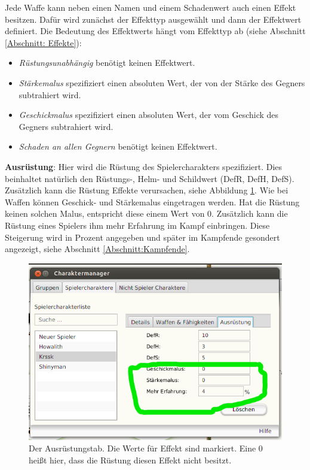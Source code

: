 \documentclass[11pt, a4paper, german]{article}
\begin{document}
Jede Waffe kann neben einen Namen und einem Schadenwert auch einen Effekt besitzen. Dafür wird zunächst der Effekttyp ausgewählt und dann der Effektwert definiert. Die Bedeutung des Effektwerts hängt vom Effekttyp ab (siehe Abschnitt \ref{Abschnitt: Effekte}): \begin{itemize}
\item[] \textit{Rüstungsunabhängig} benötigt keinen Effektwert.
\item[] \textit{Stärkemalus} spezifiziert einen absoluten Wert, der von der Stärke des Gegners subtrahiert wird.
\item[] \textit{Geschickmalus} spezifiziert einen absoluten Wert, der vom Geschick des Gegners subtrahiert wird.
\item[] \textit{Schaden an allen Gegnern} benötigt keinen Effektwert.
\end{itemize}

\textbf{Ausrüstung}: Hier wird die Rüstung des Spielercharakters spezifiziert. Dies beinhaltet natürlich den Rüstungs-, Helm- und Schildwert (DefR, DefH, DefS). Zusätzlich kann die Rüstung Effekte verursachen, siehe Abbildung \ref{fig:Spielercharaktermanager3}. Wie bei Waffen können Geschick- und Stärkemalus eingetragen werden. Hat die Rüstung keinen solchen Malus, entspricht diese einem Wert von 0. Zusätzlich kann die Rüstung eines Spielers ihm mehr Erfahrung im Kampf einbringen. Diese Steigerung wird in Prozent angegeben und später im Kampfende gesondert angezeigt, siehe Abschnitt \ref{Abschnitt:Kampfende}.\\
\begin{figure}
\centering
\includegraphics[width=1\linewidth]{Bilder/Spielercharaktermanager3}
\caption{Der Ausrüstungstab. Die Werte für Effekt sind markiert. Eine 0 heißt hier, dass die Rüstung diesen Effekt nicht besitzt.}
\label{fig:Spielercharaktermanager3}
\end{figure}
\end{document}
